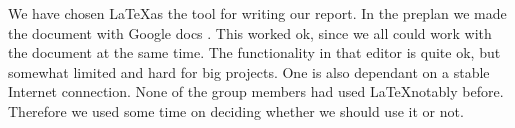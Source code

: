 We have chosen \LaTeX as the tool for writing our report. In the preplan we
made the document with Google docs \cite{GoogleDrive}. This worked ok, since
we all could work with the document at the same time. The functionality in that
editor is quite ok, but somewhat limited and hard for big projects. One is
also dependant on a stable Internet connection. None of the group members had
used \LaTeX notably before. Therefore we used some time on deciding whether we
should use it or not.